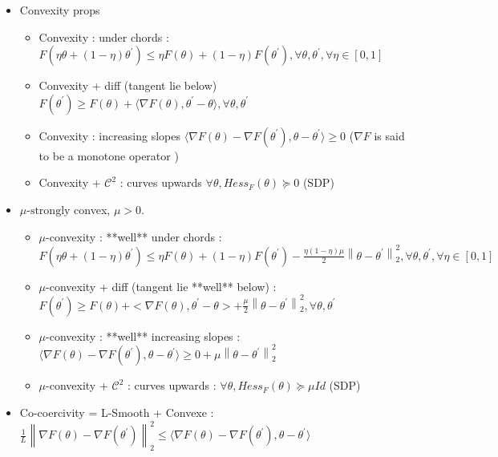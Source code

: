 \documentclass{article}
\theoremstyle{plain}%
\theoremstyle{definition}
\theoremstyle{remark}
\begin{document}
\begin{itemize}
    \item Convexity props \begin{itemize}
        \item Convexity : under chords : $ F(\eta \theta + (1 - \eta ) \theta ^\prime ) \leq  \eta F(\theta ) + (1 - \eta ) F(\theta ^\prime ), \forall \theta , \theta ^\prime , \forall \eta  \in [0, 1] $ 
        \item Convexity + diff (tangent lie below) $ F(\theta ^\prime ) \geq F(\theta ) + \langle  \nabla F(\theta ) , \theta ^\prime - \theta  \rangle ,  \forall \theta , \theta ^\prime $ 
        \item Convexity : increasing slopes $ \langle \nabla F(\theta ) - \nabla F(\theta ^\prime ), \theta - \theta ^\prime \rangle \geq 0 $ ($ \nabla F $ is said to be a monotone operator )
        \item Convexity + $ \mathcal{C}^2 $ : curves upwards $ \forall \theta , Hess_F (\theta ) \succeq 0 $ (SDP)
    \end{itemize}
    \item $ \mu \text{-strongly}$ convex, $ \mu > 0 $. \begin{itemize}
        \item $\mu$-convexity : **well** under chords : $ F(\eta \theta + (1 - \eta ) \theta ^\prime ) \leq  \eta F(\theta ) + (1 - \eta ) F(\theta ^\prime ) - \frac{\eta (1 - \eta ) \mu }{2} \left\| \theta - \theta ^\prime  \right\| ^2 _2 , \forall \theta , \theta ^\prime , \forall \eta  \in [0, 1] $ 
        \item $\mu$-convexity + diff (tangent lie **well** below) : $ F(\theta ^\prime ) \geq F(\theta ) + < \nabla F(\theta ) , \theta ^\prime - \theta  > + \frac{\mu }{2} \left\| \theta - \theta ^\prime  \right\|^2_2, \forall \theta , \theta ^\prime  $ 
        \item $\mu$-convexity : **well** increasing slopes : $ \langle \nabla F(\theta ) - \nabla F(\theta ^\prime ), \theta - \theta ^\prime \rangle \geq 0 + \mu \left\| \theta - \theta ^\prime  \right\| _2 ^2  $
        \item $\mu$-convexity + $ \mathcal{C}^2 $ : curves upwards : $ \forall \theta , Hess_F (\theta ) \succeq \mu Id $ (SDP)
    \end{itemize}
    \item Co-coercivity = L-Smooth + Convexe : $ \frac{1}{L} \left\| \nabla F(\theta ) - \nabla F(\theta ^\prime ) \right\| ^2 _2 \leq  \langle  \nabla F(\theta ) - \nabla F(\theta ^\prime ), \theta  - \theta ^\prime \rangle$ 
\end{itemize}
\end{document}
